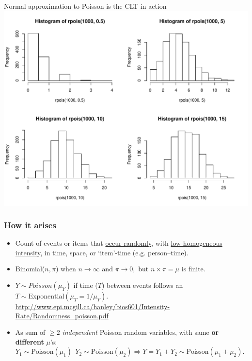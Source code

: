 \documentclass[10pt,handout]{beamer}\usepackage[]{graphicx}\usepackage[]{color}
\begin{document}
\begin{frame}{Normal approximation to Poisson is the CLT in action}
	\includegraphics[width=\linewidth]{hist-pois-1} 
\end{frame}	



\begin{frame}
	\frametitle{How it arises}
	
	
	\begin{itemize}
		\setlength\itemsep{1em}
		\item  Count of events or items that \underline{occur randomly}, with \underline{low homogeneous intensity}, in time, space, or `item'-time (e.g. person--time). 
		\item Binomial($n,\pi$) when $n \rightarrow \infty\textrm{ and } \pi \rightarrow 0,$ but $n \times \pi = \mu$ is finite.
		\item $Y\sim Poisson(\mu_Y)$ if time ($T$) between events follows an $T \sim \textrm{Exponential}(\mu_{T} = 1/\mu_{Y}).$ 
		{ \scriptsize   \url{http://www.epi.mcgill.ca/hanley/bios601/Intensity-Rate/Randomness_poisson.pdf}} 
		\item  As sum of $\ge 2$  \textit{independent} Poisson random variables, 
		with same \textbf{or different} $\mu$'s: \newline 
		$Y_{1} \sim \textrm{Poisson}(\mu_{1}) \: \:   
		Y_{2} \sim \textrm{Poisson}(\mu_{2}) \Rightarrow Y = Y_{1} + Y_{2} \sim \textrm{Poisson}(\mu_{1}+\mu_{2}).$
	\end{itemize}
\end{frame}
\end{document}
